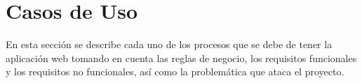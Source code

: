 	\section{Casos de Uso}
	En esta sección se describe cada uno de los procesos que se debe de tener la aplicación web tomando en cuenta las reglas de negocio, los requisitos funcionales y los requisitos no funcionales, así como la problemática que ataca el proyecto.
		
		
		
		
		
		
		
		
